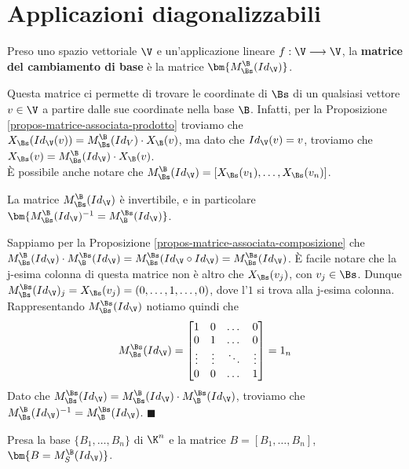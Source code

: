 \documentclass[11pt, a4paper, titlepage, oneside]{scrbook}
\begin{document}
\section{Applicazioni diagonalizzabili}

\begin{Definizione}
\label{def-matrice-cambiamento-base}
Preso uno spazio vettoriale $\V$ e un'applicazione lineare $f: \V \longrightarrow \V$, la \textbf{matrice del cambiamento di base} è la matrice $\bm{M_\Bs^\B(Id_\V)}$.
\end{Definizione}
Questa matrice ci permette di trovare le coordinate di $\Bs$ di un qualsiasi vettore $v \in \V$ a partire dalle sue coordinate nella base $\B$. Infatti, per la Proposizione \ref{propos-matrice-associata-prodotto} troviamo che $X_\Bs(Id_\V(v)) = M_\Bs^\B(Id_V) \cdot X_\B(v)$, ma dato che $Id_\V(v) = v$, troviamo che $X_\Bs(v) = M_\Bs^\B(Id_\V) \cdot X_\B(v)$. \\
È possibile anche notare che $M_\Bs^\B(Id_\V) = [X_\Bs(v_1), \ldots, X_\Bs(v_n)]$. 

\begin{Osservazione}[]
\label{oss-invertibilita-matrice-cambiamento-base}
La matrice $M_\Bs^\B(Id_\V)$ è invertibile, e in particolare $\bm{M_\Bs^\B(Id_\V)^{-1} = M_\B^\Bs(Id_\V)}$. 
\end{Osservazione}

\Dimostrazione \nopagebreak

Sappiamo per la Proposizione \ref{propos-matrice-associata-composizione} che $M_\Bs^\B(Id_\V) \cdot M_\B^\Bs(Id_\V) = M_\Bs^\Bs(Id_\V \circ Id_\V) = M_\Bs^\Bs(Id_\V)$. È facile notare che la j-esima colonna di questa matrice non è altro che $X_\Bs(v_j)$, con $v_j \in \Bs$. Dunque \mbox{$M_\Bs^\Bs(Id_\V)_j = X_\Bs(v_j) = (0,\ldots,1,\ldots,0)$}, dove l'$1$ si trova alla j-esima colonna. Rappresentando $M_\Bs^\Bs(Id_\V)$ notiamo quindi che 
\[
M_\Bs^\Bs(Id_\V) = \begin{bmatrix}
    1 & 0 & \dots & 0 \\
    0 & 1 & \dots & 0 \\
    \vdots & \vdots & \ddots & \vdots \\
    0 & 0 & \dots & 1
\end{bmatrix}
= 1_n
\]
Dato che $M_\Bs^\Bs(Id_\V) = M_\Bs^\B(Id_\V) \cdot M_\B^\Bs(Id_\V)$, troviamo che $M_\Bs^\B(Id_\V)^{-1} = M_\B^\Bs(Id_\V)$. $\blacksquare$

\begin{Proposizione}[]
\label{propos-matrice-cambiamento-base-base-standard}
Presa la base $\{B_1, \ldots, B_n\}$ di $\K^n$ e la matrice $B = [B_1, \ldots, B_n]$, $\bm{B = M_S^\B(Id_\V)}$.
\end{Proposizione}
\end{document}
